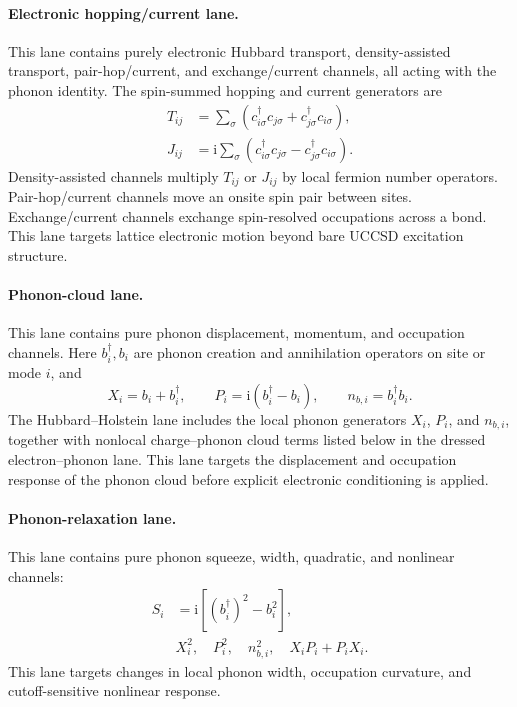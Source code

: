 \documentclass[
  reprint,
  amsmath,
  amssymb,
  aps,
  pra,
  nofootinbib,
  superscriptaddress,
  floatfix
]{revtex4-2}
\newcommand{\ii}{\mathrm{i}}
\begin{document}
\paragraph*{Electronic hopping/current lane.}
This lane contains purely electronic Hubbard transport, density-assisted
transport, pair-hop/current, and exchange/current channels, all acting with the
phonon identity. The spin-summed hopping and current generators are
\begin{align*}
T_{ij}
&=
\sum_{\sigma}
(c_{i\sigma}^{\dagger}c_{j\sigma}
+c_{j\sigma}^{\dagger}c_{i\sigma}),\\
J_{ij}
&=
\ii\sum_{\sigma}
(c_{i\sigma}^{\dagger}c_{j\sigma}
-c_{j\sigma}^{\dagger}c_{i\sigma}) .
\end{align*}
Density-assisted channels multiply \(T_{ij}\) or \(J_{ij}\) by local fermion
number operators. Pair-hop/current channels move an onsite spin pair between
sites. Exchange/current channels exchange spin-resolved occupations across a
bond. This lane targets lattice electronic motion beyond bare UCCSD excitation
structure.

\paragraph*{Phonon-cloud lane.}
This lane contains pure phonon displacement, momentum, and occupation channels.
Here \(b_i^\dagger,b_i\) are phonon creation and annihilation
operators on site or mode \(i\), and
\[
X_i=b_i+b_i^\dagger,
\qquad
P_i=\ii(b_i^\dagger-b_i),
\qquad
n_{b,i}=b_i^\dagger b_i .
\]
The Hubbard--Holstein lane includes the local phonon generators \(X_i\),
\(P_i\), and \(n_{b,i}\), together with nonlocal charge--phonon cloud terms
listed below in the dressed electron--phonon lane. This lane targets the
displacement and occupation response of the phonon cloud before explicit
electronic conditioning is applied.

\paragraph*{Phonon-relaxation lane.}
This lane contains pure phonon squeeze, width, quadratic, and nonlinear
channels:
\begin{align*}
S_i&=\ii[(b_i^\dagger)^2-b_i^2],\\
&X_i^2,\quad P_i^2,\quad n_{b,i}^2,\quad
X_iP_i+P_iX_i .
\end{align*}
This lane targets changes in local phonon width, occupation curvature, and
cutoff-sensitive nonlinear response.
\end{document}
